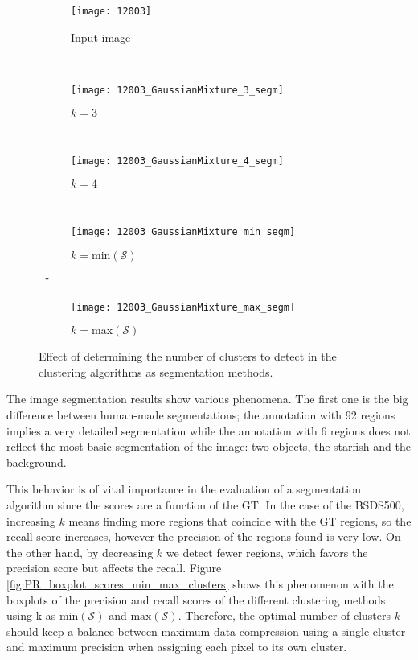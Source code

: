 \begin{figure}[!ht]
    
    \begin{subfigure}[b]{0.23\textwidth}
        \texttt{[image: 12003]}
        \caption{Input image}
    \end{subfigure} \\  \vspace{5pt}
    
    \begin{subfigure}[b]{0.23\textwidth}
    	\centering
    	\texttt{[image: 12003\_GaussianMixture\_3\_segm]}
        \caption{$k=3$ }
    \end{subfigure} ~
    \begin{subfigure}[b]{0.23\textwidth}
    	\centering
        \texttt{[image: 12003\_GaussianMixture\_4\_segm]}
        \caption{$k=4$}
    \end{subfigure} ~
    \begin{subfigure}[b]{0.23\textwidth}
    	\centering
    	\texttt{[image: 12003\_GaussianMixture\_min\_segm]}
        \caption{$k=\mathrm{min}(\mathcal{S})$}
    \end{subfigure} ~¨
    \begin{subfigure}[b]{0.23\textwidth}
    	\centering
    	\texttt{[image: 12003\_GaussianMixture\_max\_segm]}
        \caption{$k=\mathrm{max}(\mathcal{S})$}
    \end{subfigure} 
        	    
    \caption{Effect of determining the number of clusters to detect in the clustering algorithms as segmentation methods.}\label{fig:Gmixture_starfish_segms_diff_k}    
\end{figure}

The image segmentation results show various phenomena. The first one is the big difference between human-made segmentations; the annotation with 92 regions implies a very detailed segmentation while the annotation with 6 regions does not reflect the most basic segmentation of the image: two objects, the starfish and the background.

This behavior is of vital importance in the evaluation of a segmentation algorithm since the scores are a function of the GT. In the case of the BSDS500, increasing $k$ means finding more regions that coincide with the GT regions, so the recall score increases, however the precision of the regions found is very low. On the other hand, by decreasing $k$ we detect fewer regions, which favors the precision score but affects the recall. Figure \ref{fig:PR_boxplot_scores_min_max_clusters} shows this phenomenon with the boxplots of the precision and recall scores of the different clustering methods using k as $\mathrm{min}(\mathcal{S})$ and $\mathrm{max}(\mathcal{S})$.  Therefore, the optimal number of clusters $k$ should keep a balance between maximum data compression using a single cluster and maximum precision when assigning each pixel to its own cluster.


